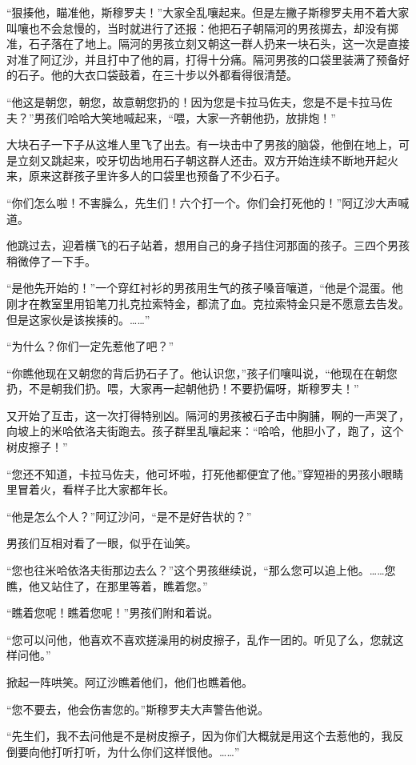 \par “狠揍他，瞄准他，斯穆罗夫！”大家全乱嚷起来。但是左撇子斯穆罗夫用不着大家叫嚷也不会怠慢的，当时就进行了还报：他把石子朝隔河的男孩掷去，却没有掷准，石子落在了地上。隔河的男孩立刻又朝这一群人扔来一块石头，这一次是直接对准了阿辽沙，并且打中了他的肩，打得十分痛。隔河男孩的口袋里装满了预备好的石子。他的大衣口袋鼓着，在三十步以外都看得很清楚。
\par “他这是朝您，朝您，故意朝您扔的！因为您是卡拉马佐夫，您是不是卡拉马佐夫？”男孩们哈哈大笑地喊起来，“喂，大家一齐朝他扔，放排炮！”
\par 大块石子一下子从这堆人里飞了出去。有一块击中了男孩的脑袋，他倒在地上，可是立刻又跳起来，咬牙切齿地用石子朝这群人还击。双方开始连续不断地开起火来，原来这群孩子里许多人的口袋里也预备了不少石子。
\par “你们怎么啦！不害臊么，先生们！六个打一个。你们会打死他的！”阿辽沙大声喊道。
\par 他跳过去，迎着横飞的石子站着，想用自己的身子挡住河那面的孩子。三四个男孩稍微停了一下手。
\par “是他先开始的！”一个穿红衬衫的男孩用生气的孩子嗓音嚷道，“他是个混蛋。他刚才在教室里用铅笔刀扎克拉索特金，都流了血。克拉索特金只是不愿意去告发。但是这家伙是该挨揍的。……”
\par “为什么？你们一定先惹他了吧？”
\par “你瞧他现在又朝您的背后扔石子了。他认识您，”孩子们嚷叫说，“他现在在朝您扔，不是朝我们扔。喂，大家再一起朝他扔！不要扔偏呀，斯穆罗夫！”
\par 又开始了互击，这一次打得特别凶。隔河的男孩被石子击中胸脯，啊的一声哭了，向坡上的米哈依洛夫街跑去。孩子群里乱嚷起来：“哈哈，他胆小了，跑了，这个树皮擦子！”
\par “您还不知道，卡拉马佐夫，他可坏啦，打死他都便宜了他。”穿短褂的男孩小眼睛里冒着火，看样子比大家都年长。
\par “他是怎么个人？”阿辽沙问，“是不是好告状的？”
\par 男孩们互相对看了一眼，似乎在讪笑。
\par “您也往米哈依洛夫街那边去么？”这个男孩继续说，“那么您可以追上他。……您瞧，他又站住了，在那里等着，瞧着您。”
\par “瞧着您呢！瞧着您呢！”男孩们附和着说。
\par “您可以问他，他喜欢不喜欢搓澡用的树皮擦子，乱作一团的。听见了么，您就这样问他。”
\par 掀起一阵哄笑。阿辽沙瞧着他们，他们也瞧着他。
\par “您不要去，他会伤害您的。”斯穆罗夫大声警告他说。
\par “先生们，我不去问他是不是树皮擦子，因为你们大概就是用这个去惹他的，我反倒要向他打听打听，为什么你们这样恨他。……”
